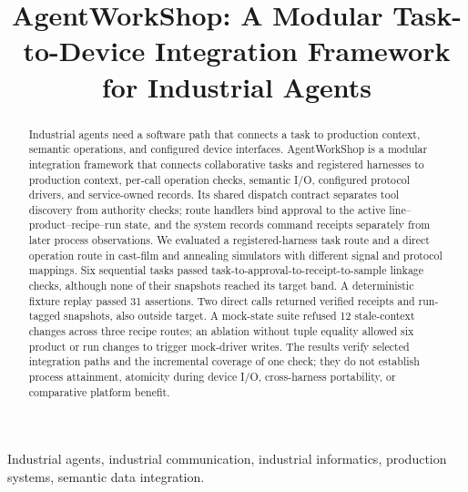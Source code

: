 \documentclass[journal]{IEEEtran}
\begin{document}

\title{AgentWorkShop: A Modular Task-to-Device Integration Framework for Industrial Agents}

\author{}

\maketitle

\begin{abstract}
Industrial agents need a software path that connects a task to production
context, semantic operations, and configured device interfaces. AgentWorkShop
is a modular integration framework that connects collaborative tasks and
registered harnesses to production context, per-call operation checks,
semantic I/O, configured protocol drivers, and service-owned records. Its
shared dispatch contract separates tool discovery from authority checks;
route handlers bind approval to the active line--product--recipe--run state,
and the system records command receipts separately from later process
observations. We evaluated a registered-harness task route and a direct
operation route in cast-film and annealing simulators with different signal
and protocol mappings. Six sequential tasks passed
task-to-approval-to-receipt-to-sample linkage checks, although none of their
snapshots reached its target band. A deterministic fixture replay passed 31
assertions. Two direct calls returned verified receipts and run-tagged
snapshots, also outside target. A mock-state suite refused 12 stale-context
changes across three recipe routes; an ablation without tuple equality allowed
six product or run changes to trigger mock-driver writes. The results verify
selected integration paths and the incremental coverage of one check; they do
not establish process attainment, atomicity during device I/O, cross-harness
portability, or comparative platform benefit.
\end{abstract}

\begin{IEEEkeywords}
Industrial agents, industrial communication, industrial informatics,
production systems, semantic data integration.
\end{IEEEkeywords}

\IEEEpeerreviewmaketitle
\end{document}
